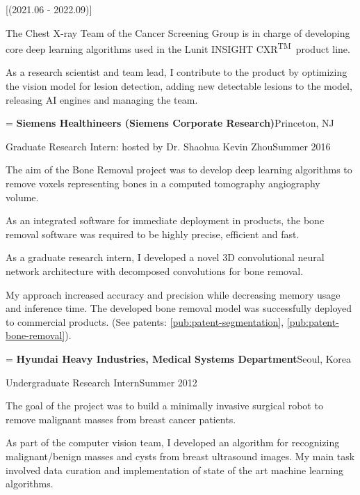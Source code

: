 \documentclass[11pt,letterpaper]{article}
\makeatletter
\newlength{\entryindent}\setlength{\entryindent}{13.94pt}
\newcommand{\entry}[4]{%
  \par\if@nobreak\vskip 2.3pt\else\vskip 8.3pt\fi
  {\leftskip=\entryindent\rightskip=1.87pt
   \textbf{#1}\hfill #2\par\nobreak\vskip 1.5pt
   {\small #3\hfill #4\par}}\nobreak}
\newcommand{\pubref}[1]{\ref{pub:#1}}
\newcommand{\TM}{\textsuperscript{TM}}
\makeatother
\begin{document}
\begin{cvitems}
  [(2021.06 - 2022.09)]
  \item The Chest X-ray Team of the Cancer Screening Group is in charge of developing core deep learning algorithms
        used in the Lunit INSIGHT CXR\TM\ product line.
  \item As a research scientist and team lead, I contribute to the product by optimizing the vision model for lesion
        detection, adding new detectable lesions to the model, releasing AI engines and managing the team.
\end{cvitems}

\entry{Siemens Healthineers (Siemens Corporate Research)}{Princeton, NJ}
      {Graduate Research Intern: hosted by Dr. Shaohua Kevin Zhou}{Summer 2016}
\begin{cvitems}
  \item The aim of the Bone Removal project was to develop deep learning algorithms to remove voxels representing
        bones in a computed tomography angiography volume.
  \item As an integrated software for immediate deployment in products, the bone removal software was required to be
        highly precise, efficient and fast.
  \item As a graduate research intern, I developed a novel 3D convolutional neural network architecture with
        decomposed convolutions for bone removal.
  \item My approach increased accuracy and precision while decreasing memory usage and inference time. The
        developed bone removal model was successfully deployed to commercial products.
        (See patents: \pubref{patent-segmentation}, \pubref{patent-bone-removal}).
\end{cvitems}

\entry{Hyundai Heavy Industries, Medical Systems Department}{Seoul, Korea}
      {Undergraduate Research Intern}{Summer 2012}
\begin{cvitems}
  \item The goal of the project was to build a minimally invasive surgical robot to remove malignant masses from breast
        cancer patients.
  \item As part of the computer vision team, I developed an algorithm for recognizing malignant/benign masses and
        cysts from breast ultrasound images. My main task involved data curation and implementation of state of the
        art machine learning algorithms.
\end{cvitems}
\end{document}
